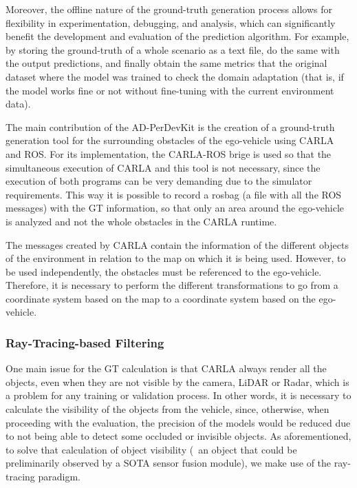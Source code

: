 Moreover, the offline nature of the ground-truth generation process allows for flexibility in experimentation, debugging, and analysis, which can significantly benefit the development and evaluation of the prediction algorithm. For example, by storing the ground-truth of a whole scenario as a text file, do the same with the output predictions, and finally obtain the same metrics that the original dataset where the model was trained to check the domain adaptation (that is, if the model works fine or not without fine-tuning with the current environment data).

The main contribution of the AD-PerDevKit is the creation of a ground-truth generation tool for the surrounding obstacles of the ego-vehicle using CARLA and ROS. For its implementation, the CARLA-ROS brige is used so that the simultaneous execution of CARLA and this tool is not necessary, since the execution of both programs can be very demanding due to the simulator requirements. This way it is possible to record a rosbag (a file with all the ROS messages) with the GT information, so that only an area around the ego-vehicle is analyzed and not the whole obstacles in the CARLA runtime.

The messages created by CARLA contain the information of the different objects of the environment in relation to the map on which it is being used. However, to be used independently, the obstacles must be referenced to the ego-vehicle. Therefore, it is necessary to perform the different transformations to go from a coordinate system based on the map to a coordinate system based on the ego-vehicle.

\subsubsection{Ray-Tracing-based Filtering}
\label{subsubsec:8_ad_perdevkit_object_visibility}

One main issue for the \ac{GT} calculation is that \ac{CARLA} always render all the objects, even when they are not visible by the camera, LiDAR or Radar, which is a problem for any training or validation process. In other words, it is necessary to calculate the visibility of the objects from the vehicle, since, otherwise, when proceeding with the evaluation, the precision of the models would be reduced due to not being able to detect some occluded or invisible objects. As aforementioned, to solve that calculation of object visibility (\ie \ an object that could be preliminarily observed by a \ac{SOTA} sensor fusion module), we make use of the ray-tracing paradigm.

